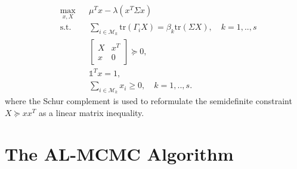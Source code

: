 {\begin{equation}
\begin{aligned}
& \max_{x,X}
& & \mu^Tx - \lambda(x^T\Sigma x) \\
& \text{s.t.}
&& \sum_{i \in \mathcal{M}_k} \mbox{tr}(\Gamma_i X) = \beta_k \mbox{tr}(\Sigma X), \quad k=1,..,s \\
&&&\begin{bmatrix}X & x^T\\x & 0\end{bmatrix}\succeq 0,\\
&&&\mathds{1}^T x = 1,\\
&&&\sum_{i \in \mathcal{M}_k} x_i \geq 0, \quad k=1,..,s.
\end{aligned}
\end{equation}
where the Schur complement is used to reformulate the semidefinite constraint $X \succeq  x x^T$ as a linear matrix inequality.

\section{The AL-MCMC Algorithm}
}
